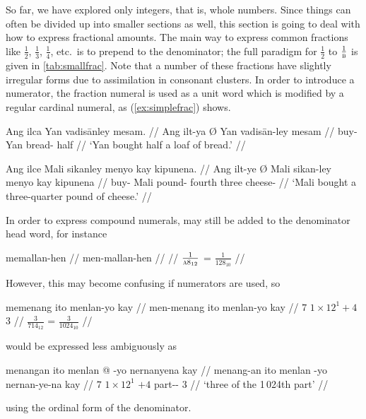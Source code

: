 So far, we have explored only integers, that is, whole numbers. Since things
can often be divided up into smaller sections as well, this section is going to
deal with how to express fractional amounts. The main way to express common
fractions like $\frac{1}{2}$, $\frac{1}{3}$, $\frac{1}{4}$, etc.\ is to prepend
 to the denominator; the full paradigm for $\frac{1}{2}$
to $\frac{1}{\textsc{b}}$ is given in \autoref{tab:smallfrac}. Note that a number of
these fractions have slightly irregular forms due to assimilation in consonant
clusters. In order to introduce a numerator, the fraction numeral is used as a
unit word which is modified by a regular cardinal numeral, as
(\ref{ex:simplefrac}) shows.

\pex\label{ex:simplefrac}
\a\begingl
	\gla Ang ilca {} Yan vadisānley mesam. //
	\glb Ang ilt-ya Ø Yan vadisān-ley mesam //
	\glc \AgtT{} buy-\TsgM{} \Top{} Yan bread-\PargI{} half //
	\glft `Yan bought half a loaf of bread.' //
\endgl

\a\begingl
	\gla Ang ilce {} Mali sikanley menyo kay kipunena. //
	\glb Ang ilt-ye Ø Mali sikan-ley menyo kay kipunena //
	\glc \AgtT{} buy-\TsgM{} \Top{} Mali pound-\PargI{} fourth three
		cheese-\Gen{} //
	\glft `Mali bought a three-quarter pound of cheese.' //
\endgl
\xe

In order to express compound numerals,  may still be added to
the denominator head word, for instance

\ex
\begingl
	\gla memallan-hen //
	\glb men-mallan-hen //
	 //
	\glft $\frac{1}{\textsc{a}8_{12}}$ = $\frac{1}{128_{10}}$ //
\endgl
\xe

\noindent However, this may become confusing if numerators are used, so %

\ex
\ljudge\ques\begingl
	\gla memenang ito menlan-yo kay //
	\glb men-menang ito menlan-yo kay //
	 {$7$} {$1 \times 12^1 + 4$} {$3$} //
	\glft $\frac{3}{714_{12}}$ = $\frac{3}{1024_{10}}$ //
\endgl
\xe

\noindent would be expressed less ambiguously as

\ex
\begingl
	\gla menangan ito menlan @ -yo nernanyena kay //
	\glb menang-an ito menlan -yo nernan-ye-na kay //
	 {$7$} {$1 \times 12^1$} {$+4$} part-\Pl{}-\Gen{} 
		$3$ //
	\glft `three of the 1\,024th part' //
\endgl
\xe

\noindent using the ordinal form of the denominator.


